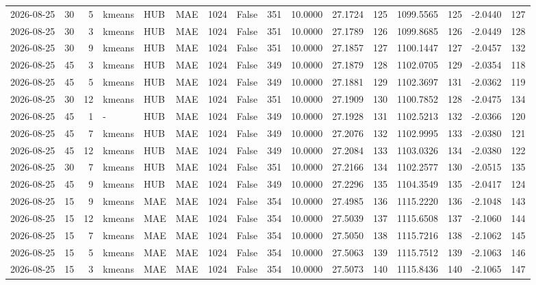 \documentclass[10pt]{article}
\begin{document}
\begin{landscape}
\begin{longtable}{@{}lrrlllrcrrrrrrrr@{}}
2026-08-25 & 30 & 5 & kmeans & HUB & MAE & 1024 & False & 351 & 10.0000 & 27.1724 & 125 & 1099.5565 & 125 & -2.0440 & 127 \\
2026-08-25 & 30 & 3 & kmeans & HUB & MAE & 1024 & False & 351 & 10.0000 & 27.1789 & 126 & 1099.8685 & 126 & -2.0449 & 128 \\
2026-08-25 & 30 & 9 & kmeans & HUB & MAE & 1024 & False & 351 & 10.0000 & 27.1857 & 127 & 1100.1447 & 127 & -2.0457 & 132 \\
2026-08-25 & 45 & 3 & kmeans & HUB & MAE & 1024 & False & 349 & 10.0000 & 27.1879 & 128 & 1102.0705 & 129 & -2.0354 & 118 \\
2026-08-25 & 45 & 5 & kmeans & HUB & MAE & 1024 & False & 349 & 10.0000 & 27.1881 & 129 & 1102.3697 & 131 & -2.0362 & 119 \\
2026-08-25 & 30 & 12 & kmeans & HUB & MAE & 1024 & False & 351 & 10.0000 & 27.1909 & 130 & 1100.7852 & 128 & -2.0475 & 134 \\
2026-08-25 & 45 & 1 & - & HUB & MAE & 1024 & False & 349 & 10.0000 & 27.1928 & 131 & 1102.5213 & 132 & -2.0366 & 120 \\
2026-08-25 & 45 & 7 & kmeans & HUB & MAE & 1024 & False & 349 & 10.0000 & 27.2076 & 132 & 1102.9995 & 133 & -2.0380 & 121 \\
2026-08-25 & 45 & 12 & kmeans & HUB & MAE & 1024 & False & 349 & 10.0000 & 27.2084 & 133 & 1103.0326 & 134 & -2.0380 & 122 \\
2026-08-25 & 30 & 7 & kmeans & HUB & MAE & 1024 & False & 351 & 10.0000 & 27.2166 & 134 & 1102.2577 & 130 & -2.0515 & 135 \\
2026-08-25 & 45 & 9 & kmeans & HUB & MAE & 1024 & False & 349 & 10.0000 & 27.2296 & 135 & 1104.3549 & 135 & -2.0417 & 124 \\
2026-08-25 & 15 & 9 & kmeans & MAE & MAE & 1024 & False & 354 & 10.0000 & 27.4985 & 136 & 1115.2220 & 136 & -2.1048 & 143 \\
2026-08-25 & 15 & 12 & kmeans & MAE & MAE & 1024 & False & 354 & 10.0000 & 27.5039 & 137 & 1115.6508 & 137 & -2.1060 & 144 \\
2026-08-25 & 15 & 7 & kmeans & MAE & MAE & 1024 & False & 354 & 10.0000 & 27.5050 & 138 & 1115.7216 & 138 & -2.1062 & 145 \\
2026-08-25 & 15 & 5 & kmeans & MAE & MAE & 1024 & False & 354 & 10.0000 & 27.5063 & 139 & 1115.7512 & 139 & -2.1063 & 146 \\
2026-08-25 & 15 & 3 & kmeans & MAE & MAE & 1024 & False & 354 & 10.0000 & 27.5073 & 140 & 1115.8436 & 140 & -2.1065 & 147 \\

\end{longtable}
\end{landscape}
\end{document}
